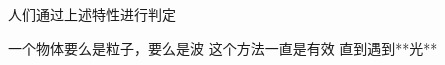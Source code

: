 \begin{frame} 
    人们通过上述特性进行判定\\
    \begin{itemize}
        \Item  一个物体要么是粒子，要么是波
        \Item  这个方法一直是有效
        \Item  直到遇到**光** 
    \end{itemize}   
    \begin{figure}
        \centering
    \end{figure} 
    \setcounter{subfigure}{0}
\end{frame}

